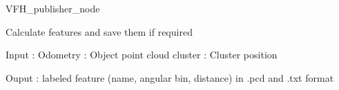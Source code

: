 VFH_publisher_node

Calculate features and save them if required

Input : Odometry
      : Object point cloud cluster
      : Cluster position 

Ouput : labeled feature (name, angular bin, distance) in .pcd and .txt format



